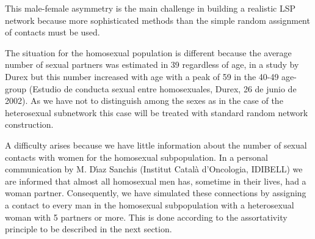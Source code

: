 This male-female asymmetry is the main challenge in building a realistic LSP network because more sophisticated methods than the simple random assignment of contacts must be used.

The situation for the homosexual population is different because the average number of sexual partners was estimated in 39 regardless of age, in a study by Durex but this number increased with age with a peak of 59 in the 40-49 age-group (Estudio de conducta sexual entre homosexuales, Durex, 26 de junio de 2002).  As we have not to distinguish among the sexes as in the case of the heterosexual subnetwork this case will be treated with standard random network construction.

A difficulty arises because we have little information about the number of sexual contacts with women for the homosexual subpopulation. In a personal communication by M. D\'{\i}az Sanchis (Institut Catal\`{a} d'Oncologia, IDIBELL) we are informed that almost all homosexual men has, sometime in their lives, had a woman partner.  Consequently, we have simulated these connections by assigning a contact to every man in the homosexual subpopulation with a heterosexual woman with 5 partners or more. This is done according to the assortativity principle to be described in the next section.
